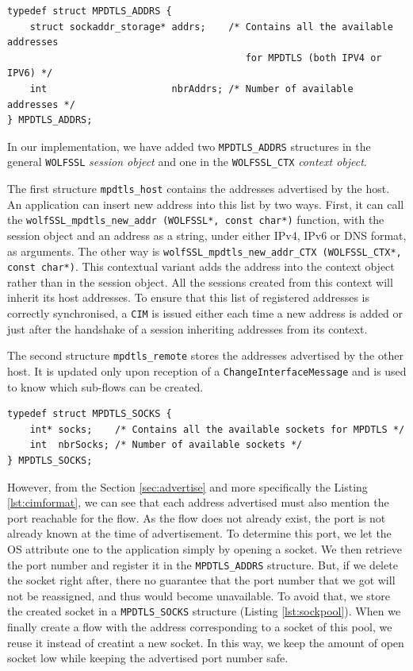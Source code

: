 
\begin{lstlisting}[caption=Structure storing addresses]
typedef struct MPDTLS_ADDRS {
    struct sockaddr_storage* addrs;    /* Contains all the available addresses
                                          for MPDTLS (both IPV4 or IPV6) */
    int                      nbrAddrs; /* Number of available addresses */
} MPDTLS_ADDRS;
\end{lstlisting}

In our implementation, we have added two \texttt{MPDTLS\_ADDRS} structures in the general \texttt{WOLFSSL} \textit{session object} and one in the \texttt{WOLFSSL\_CTX} \textit{context object}.

The first structure \texttt{mpdtls\_host} contains the addresses advertised by the host. An application can insert new address into this list by two ways. First, it can call the \texttt{wolfSSL\_mpdtls\_new\_addr (WOLFSSL*, const char*)} function, with the session object and an address as a string, under either IPv4, IPv6 or DNS format, as arguments. The other way is \texttt{wolfSSL\_mpdtls\_new\_addr\_CTX (WOLFSSL\_CTX*, const char*)}. This contextual variant adds the address into the context object rather than in the session object. All the sessions created from this context will inherit its host addresses. To ensure that this list of registered addresses is correctly synchronised, a \texttt{CIM} is issued either each time a new address is added or just after the handshake of a session inheriting addresses from its context.

The second structure \texttt{mpdtls\_remote} stores the addresses advertised by the other host. It is updated only upon reception of a \texttt{ChangeInterfaceMessage} and is used to know which sub-flows can be created.

\begin{lstlisting}[caption=Structure containing inactive socket,label=lst:sockpool]
typedef struct MPDTLS_SOCKS {
    int* socks;    /* Contains all the available sockets for MPDTLS */
    int  nbrSocks; /* Number of available sockets */
} MPDTLS_SOCKS;
\end{lstlisting}

However, from the Section \ref{sec:advertise} and more specifically the Listing \ref{lst:cimformat}, we can see that each address advertised must also mention the port reachable for the flow. As the flow does not already exist, the port is not already known at the time of advertisement. To determine this port, we let the OS attribute one to the application simply by opening a socket. We then retrieve the port number and register it in the \texttt{MPDTLS\_ADDRS} structure. But, if we delete the socket right after, there no guarantee that the port number that we got will not be reassigned, and thus would become unavailable. To avoid that, we store the created socket in a \texttt{MPDTLS\_SOCKS} structure (Listing \ref{lst:sockpool}). When we finally create a flow with the address corresponding to a socket of this pool, we reuse it instead of creatint a new socket. In this way, we keep the amount of open socket low while keeping the advertised port number safe.

